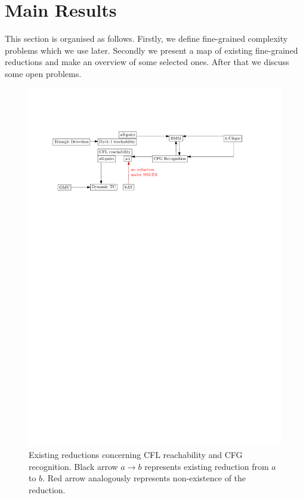 \documentclass[acmsmall,nonacm]{acmart}
\begin{document}
	
	\section{Main Results}
	
	This section is organised as follows. Firstly, we define fine-grained complexity problems which we use later. Secondly we present a map of existing fine-grained reductions and make an overview of some selected ones. After that we discuss some open problems. 
	
	\begin{figure}[!htp]
		
		\begin{center}  
			\includegraphics[scale = 0.6]{map_popl.pdf}
		\end{center}
		
		\caption{Existing reductions concerning CFL reachability and CFG recognition. Black arrow $a \rightarrow b$ represents existing reduction from $a$ to $b$. Red arrow analogously represents non-existence of the reduction. }
		\label{fig:map}
		
	\end{figure}
	
\end{document}
